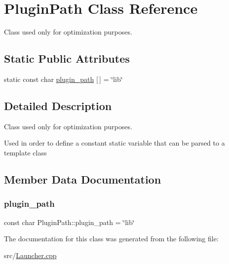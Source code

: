 \hypertarget{classPluginPath}{}\section{Plugin\+Path Class Reference}
\label{classPluginPath}


Class used only for optimization purposes.  


\subsection*{Static Public Attributes}
\begin{DoxyCompactItemize}
\item 
static const char \hyperlink{classPluginPath_ac03655dbc112455578dab1c2f4bc376f}{plugin\+\_\+path} \mbox{[}$\,$\mbox{]} = \char`\"{}lib\char`\"{}
\end{DoxyCompactItemize}


\subsection{Detailed Description}
Class used only for optimization purposes. 

Used in order to define a constant static variable that can be parsed to a template class 

\subsection{Member Data Documentation}
\mbox{\label{classPluginPath_ac03655dbc112455578dab1c2f4bc376f}} 
\subsubsection{\texorpdfstring{plugin\+\_\+path}{plugin\_path}}
{\footnotesize\ttfamily const char Plugin\+Path\+::plugin\+\_\+path = \char`\"{}lib\char`\"{}\hspace{0.3cm}{\ttfamily [static]}}



The documentation for this class was generated from the following file\+:\begin{DoxyCompactItemize}
\item 
src/\hyperlink{Launcher_8cpp}{Launcher.\+cpp}\end{DoxyCompactItemize}
